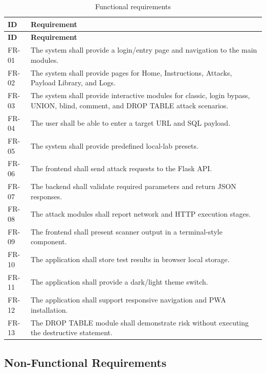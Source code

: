 \documentclass[12pt,a4paper]{article}
\begin{document}
\begin{longtable}{p{1.8cm}p{11.8cm}}
\caption{Functional requirements}\label{tab:functional-requirements}\\
\toprule
\textbf{ID} & \textbf{Requirement} \\
\midrule
\endfirsthead
\toprule
\textbf{ID} & \textbf{Requirement} \\
\midrule
\endhead
FR-01 & The system shall provide a login/entry page and navigation to the main modules. \\
FR-02 & The system shall provide pages for Home, Instructions, Attacks, Payload Library, and Logs. \\
FR-03 & The system shall provide interactive modules for classic, login bypass, UNION, blind, comment, and DROP TABLE attack scenarios. \\
FR-04 & The user shall be able to enter a target URL and SQL payload. \\
FR-05 & The system shall provide predefined local-lab presets. \\
FR-06 & The frontend shall send attack requests to the Flask API. \\
FR-07 & The backend shall validate required parameters and return JSON responses. \\
FR-08 & The attack modules shall report network and HTTP execution stages. \\
FR-09 & The frontend shall present scanner output in a terminal-style component. \\
FR-10 & The application shall store test results in browser local storage. \\
FR-11 & The application shall provide a dark/light theme switch. \\
FR-12 & The application shall support responsive navigation and PWA installation. \\
FR-13 & The DROP TABLE module shall demonstrate risk without executing the destructive statement. \\
\bottomrule
\end{longtable}

\subsection{Non-Functional Requirements}
\end{document}
